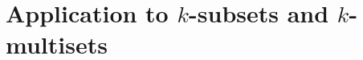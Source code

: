 \documentclass[US-letter,USenglish,authorcolumns,autoref]{lipics-v2021}
\begin{document}

\section{Application to $k$-subsets and $k$-multisets}  \label{sec:results}
\end{document}

